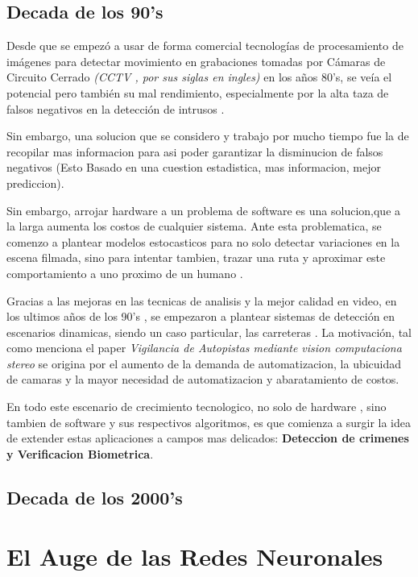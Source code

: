 \documentclass[a4paper]{IEEEtranUNT}
\begin{document}
\subsection{Decada de los 90's}

Desde que se empezó a usar de forma comercial tecnologías de procesamiento de imágenes para detectar movimiento en
grabaciones tomadas por Cámaras de Circuito Cerrado \textit{(CCTV , por sus siglas en ingles)} en los a\~nos 80's,
se veía el potencial pero también su mal rendimiento, especialmente por la alta taza de falsos negativos 
en la detección de intrusos \citep{Sage}.

Sin embargo, una solucion que se considero y trabajo por mucho tiempo fue la de recopilar mas informacion para asi poder
garantizar la disminucion de falsos negativos (Esto Basado en una cuestion estadistica, mas informacion, mejor prediccion).

Sin embargo, arrojar hardware a un problema de software es una solucion,que a la larga aumenta los costos de cualquier sistema.
Ante esta problematica, se comenzo a plantear modelos estocasticos para no solo detectar variaciones en la escena filmada, sino
para intentar tambien, trazar una ruta y aproximar este comportamiento a uno proximo de un humano \citep{Sage}.

Gracias a las mejoras en las tecnicas de analisis y la mejor calidad en video, en los ultimos a\~nos de los 90's , se empezaron
a plantear sistemas de detección en escenarios dinamicas, siendo un caso particular, las carreteras \citep{Manendez}. La motivación,
tal como menciona el paper \textit{Vigilancia de Autopistas mediante vision computaciona stereo} \citep[Abstract]{Manendez}
se origina por el aumento de la demanda de automatizacion, la ubicuidad de camaras y la mayor necesidad de automatizacion y abaratamiento
de costos.

En todo este escenario de crecimiento tecnologico, no solo de hardware , sino tambien de software y sus respectivos algoritmos, es que
comienza a surgir la idea de extender estas aplicaciones a campos mas delicados: \textbf{Deteccion de crimenes y Verificacion Biometrica}.

\subsection{Decada de los 2000's}



\section{El Auge de las Redes Neuronales}
\end{document}
